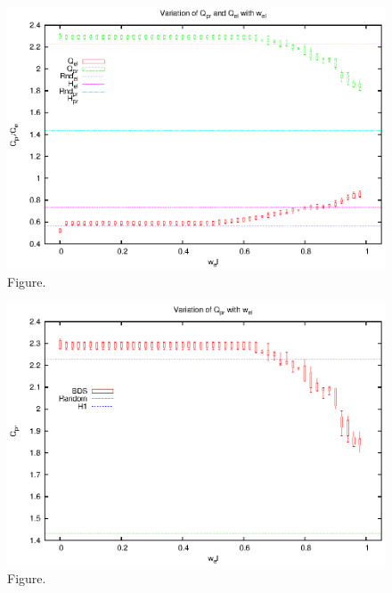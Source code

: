 \documentclass[12pt,a4paper]{article}
\begin{document}
\clearpage
\begin{figure}[htbp]
 \begin{center}
  \includegraphics[scale=1.0, angle=0]{figures/cmp_elpr.eps}
 \end{center}
  \caption[Figure.]
{Figure.}
\end{figure}
\clearpage
\begin{figure}[htbp]
 \begin{center}
  \includegraphics[scale=1.0, angle=0]{figures/cmp_pr.eps}
 \end{center}
  \caption[Figure.]
{Figure.}
\end{figure}
\clearpage
\end{document}
